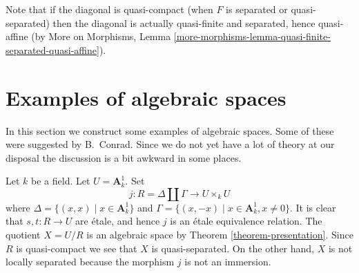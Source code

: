\noindent
Note that if the diagonal is quasi-compact (when $F$ is separated or
quasi-separated) then the diagonal is actually
quasi-finite and separated, hence quasi-affine (by More on Morphisms,
Lemma \ref{more-morphisms-lemma-quasi-finite-separated-quasi-affine}).








\section{Examples of algebraic spaces}
\label{section-examples}

\noindent
In this section we construct some examples of algebraic spaces.
Some of these were suggested by B.\ Conrad.
Since we do not yet have a lot of theory at our disposal the
discussion is a bit awkward in some places.

\begin{example}
\label{example-affine-line-involution}
Let $k$ be a field. Let $U = \mathbf{A}^1_k$. Set
$$
j : R = \Delta \coprod \Gamma \longrightarrow U \times_k U
$$
where $\Delta = \{(x, x) \mid x \in \mathbf{A}^1_k\}$ and
$\Gamma = \{(x, -x) \mid x \in \mathbf{A}^1_k, x \not = 0\}$.
It is clear that $s, t : R \to U$ are \'etale, and hence
$j$ is an \'etale equivalence relation.
The quotient $X = U/R$ is an algebraic space by
Theorem \ref{theorem-presentation}.
Since $R$ is quasi-compact we see that $X$ is quasi-separated.
On the other hand, $X$ is not locally separated because
the morphism $j$ is not an immersion.
\end{example}

